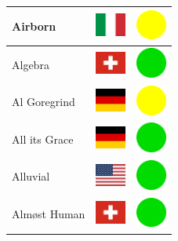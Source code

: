 \documentclass[12pt, a4paper, twoside]{report}
\begin{document}
\begin{center}
\begin{longtable}{|p{5cm}|p{2cm}|p{2cm}|}
Airborn & \includegraphics[width=1cm]{4x3/it} & \includegraphics[width=1cm]{likes/m} \\ \hline
Algebra & \includegraphics[width=1cm]{4x3/ch} & \includegraphics[width=1cm]{likes/y} \\ \hline
Al Goregrind & \includegraphics[width=1cm]{4x3/de} & \includegraphics[width=1cm]{likes/m} \\ \hline
All its Grace & \includegraphics[width=1cm]{4x3/de} & \includegraphics[width=1cm]{likes/y} \\ \hline
Alluvial & \includegraphics[width=1cm]{4x3/us} & \includegraphics[width=1cm]{likes/y} \\ \hline
Almøst Human & \includegraphics[width=1cm]{4x3/ch} & \includegraphics[width=1cm]{likes/y} \\ \hline

\end{longtable}
\end{center}
\end{document}
